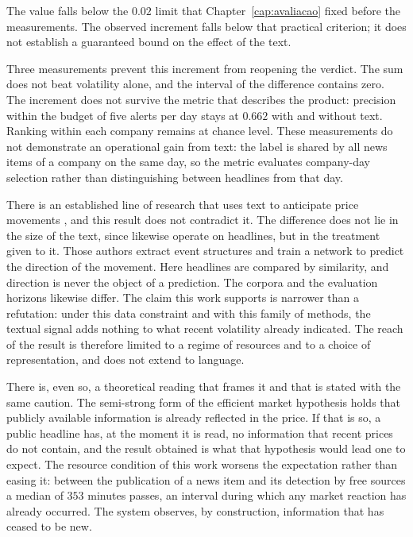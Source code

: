The value falls below the $0.02$ limit that Chapter~\ref{cap:avaliacao} fixed before the
measurements. The observed increment falls below that practical criterion; it does not establish
a guaranteed bound on the effect of the text.

Three measurements prevent this increment from reopening the verdict. The sum does not beat
volatility alone, and the interval of the difference contains zero. The increment does not survive
the metric that describes the product: precision within the budget of five alerts per day stays at
$0.662$ with and without text. Ranking within each company remains at chance level. These
measurements do not demonstrate an operational gain from text: the label is shared by all news
items of a company on the same day, so the metric evaluates company-day selection rather than
distinguishing between headlines from that day.

There is an established line of research that uses text to anticipate price movements
\autocite{xing2018nlffsurvey, ding2015deep}, and this result does not contradict it. The difference
does not lie in the size of the text, since \textcite{ding2015deep} likewise operate on headlines,
but in the treatment given to it. Those authors extract event structures and train a network to
predict the direction of the movement. Here headlines are compared by similarity, and direction is
never the object of a prediction. The corpora and the evaluation horizons likewise differ. The
claim this work supports is narrower than a refutation: under this data constraint and with this
family of methods, the textual signal adds nothing to what recent volatility already indicated. The
reach of the result is therefore limited to a regime of resources and to a choice of
representation, and does not extend to language.

There is, even so, a theoretical reading that frames it and that is stated with the same caution.
The semi-strong form of the efficient market hypothesis \autocite{fama1970efficient} holds that
publicly available information is already reflected in the price. If that is so, a public headline
has, at the moment it is read, no information that recent prices do not contain, and the result
obtained is what that hypothesis would lead one to expect. The resource condition of this work
worsens the expectation rather than easing it: between the publication of a news item and its
detection by free sources a median of $353$ minutes passes, an interval during which any market
reaction has already occurred. The system observes, by construction, information that has ceased to
be new.

